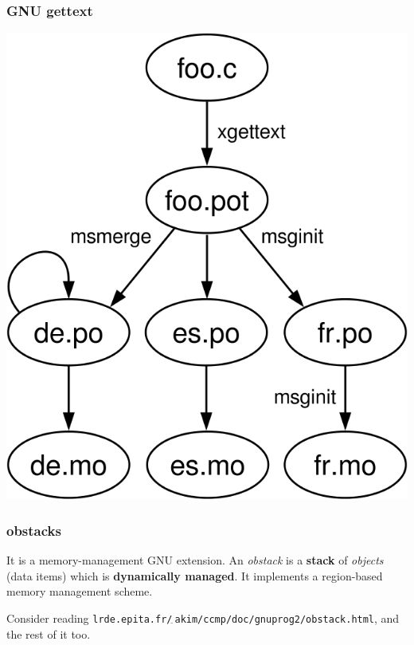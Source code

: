 \documentclass{beamer}
\begin{document}
\begin{frame}[fragile]
  \frametitle{GNU gettext}
  \begin{center}
    \includegraphics[scale=0.3]{Gettext}
  \end{center}
\end{frame}

\begin{frame}
  \frametitle{obstacks}
It is a memory-management GNU extension. An \textit{obstack} is a
\textbf{stack} of \textit{objects} (data items) which is \textbf{dynamically
managed}. It implements a region-based memory management scheme.

\vfill

Consider reading
\texttt{lrde.epita.fr/$_{\widetilde{~}}$akim/ccmp/doc/gnuprog2/obstack.html}, and
the rest of it too.
\end{frame}
\end{document}
